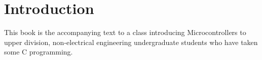 \chapter{Introduction}

This book is the accompanying text to a class introducing Microcontrollers
to upper division, non-electrical engineering undergraduate students who 
have taken some C programming.